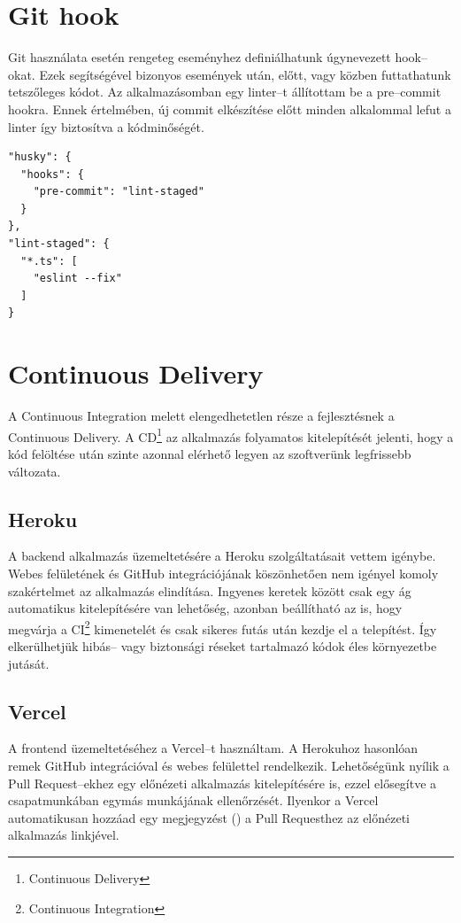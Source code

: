 \section{Git hook}
Git használata esetén rengeteg eseményhez definiálhatunk úgynevezett hook–okat.
Ezek segítségével bizonyos események után, előtt, vagy közben futtathatunk tetszőleges kódot.
Az alkalmazásomban egy linter–t állítottam be a pre–commit hookra.
Ennek értelmében, új commit elkészítése előtt minden alkalommal lefut a linter így biztosítva a kódminőségét.

\begin{lstlisting}[style=ES6]    
"husky": {
  "hooks": {
    "pre-commit": "lint-staged"
  }
},
"lint-staged": {
  "*.ts": [
    "eslint --fix"
  ]
}
\end{lstlisting}
  

\section{Continuous Delivery}
A Continuous Integration melett elengedhetetlen része a fejlesztésnek a Continuous Delivery.
A CD\footnote{Continuous Delivery} az alkalmazás folyamatos kitelepítését jelenti, hogy a kód felöltése után szinte azonnal elérhető legyen az szoftverünk legfrissebb változata.


\subsection{Heroku}
A backend alkalmazás üzemeltetésére a Heroku szolgáltatásait vettem igénybe.
Webes felületének és GitHub integrációjának köszönhetően nem igényel komoly szakértelmet az alkalmazás elindítása.
Ingyenes keretek között csak egy ág automatikus kitelepítésére van lehetőség, azonban beállítható az is, hogy megvárja a CI\footnote{Continuous Integration} kimenetelét és csak sikeres futás után kezdje el a telepítést.
Így elkerülhetjük hibás– vagy biztonsági réseket tartalmazó kódok éles környezetbe jutását.


\subsection{Vercel}
A frontend üzemeltetéséhez a Vercel–t használtam. 
A Herokuhoz hasonlóan remek GitHub integrációval és webes felülettel rendelkezik. 
Lehetőségünk nyílik a Pull Request–ekhez egy előnézeti alkalmazás kitelepítésére is, ezzel elősegítve a csapatmunkában egymás munkájának ellenőrzését.
Ilyenkor a Vercel automatikusan hozzáad egy megjegyzést () a Pull Requesthez az előnézeti alkalmazás linkjével.

